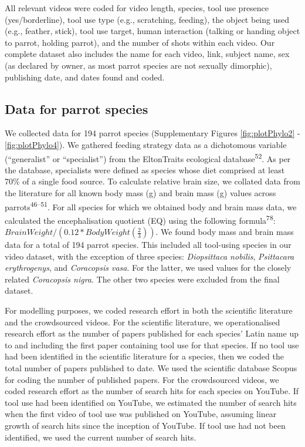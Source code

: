 \documentclass[
  man,floatsintext]{apa6}
\begin{document}
All relevant videos were coded for video length, species, tool use presence
(yes/borderline), tool use type (e.g., scratching, feeding), the object being
used (e.g., feather, stick), tool use target, human interaction
(talking or handing object to parrot, holding parrot), and the number of shots
within each video. Our complete dataset also includes the name for each video,
link, subject name, sex (as declared by owner, as most parrot species are not
sexually dimorphic), publishing date, and dates found and coded.

\hypertarget{data-for-parrot-species}{%
\subsection{Data for parrot species}\label{data-for-parrot-species}}

We collected data for 194 parrot species (Supplementary Figures
\ref{fig:plotPhylo2} - \ref{fig:plotPhylo4}). We gathered feeding strategy
data as a dichotomous variable (``generalist'' or ``specialist'') from the
EltonTraits ecological database\textsuperscript{52}. As per the database, specialists
were defined as species whose diet comprised at least 70\% of a single food
source. To calculate relative brain size, we collated data from the literature
for all known body mass (g) and brain mass (g) values across
parrots\textsuperscript{46--51}. For all species for which we obtained body and brain mass data, we
calculated the encephalisation quotient (EQ) using the following
formula\textsuperscript{78}: \(BrainWeight / (0.12 * BodyWeight(\frac{2}{3}))\). We
found body mass and brain mass data for a total of 194 parrot species. This
included all tool-using species in our video dataset, with the exception of
three species: \emph{Diopsittaca nobilis}, \emph{Psittacara erythrogenys}, and \emph{Coracopsis
vasa}. For the latter, we used values for the closely related \emph{Coracopsis
nigra}. The other two species were excluded from the final dataset.

For modelling purposes, we coded research effort in both the scientific
literature and the crowdsourced videos. For the scientific literature, we
operationalised research effort as the number of papers published for each
species' Latin name up to and including the first paper containing tool use for
that species. If no tool use had been identified in the scientific literature
for a species, then we coded the total number of papers published to date. We
used the scientific database Scopus for coding the number of published papers.
For the crowdsourced videos, we coded research effort as the number of search
hits for each species on YouTube. If tool use had been identified on YouTube, we
estimated the number of search hits when the first video of tool use was
published on YouTube, assuming linear growth of search hits since the inception
of YouTube. If tool use had not been identified, we used the current number of
search hits.
\end{document}
